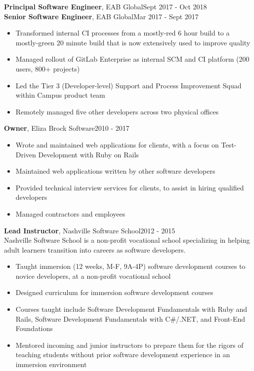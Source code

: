 \documentclass[line, margin, 10pt]{res}
\begin{document}
\begin{resume}
{\bf Principal Software Engineer}, EAB Global\hfill Sept 2017 - Oct 2018\\
{\bf Senior Software Engineer}, EAB Global\hfill Mar 2017 - Sept 2017
\begin{itemize} \itemsep -2pt  %
  \item Transformed internal CI processes from a mostly-red 6 hour build to a mostly-green 20 minute build that is now extensively used to improve quality
  \item Managed rollout of GitLab Enterprise as internal SCM and CI platform (200 users, 800+ projects)
  \item Led the Tier 3 (Developer-level) Support and Process Improvement Squad within Campus product team
  \item Remotely managed five other developers across two physical offices
\end{itemize}

{\bf Owner}, Eliza Brock Software\hfill 2010 - 2017
\begin{itemize} \itemsep -2pt  %
  \item Wrote and maintained web applications for clients, with a focus on Test-Driven \mbox{Development} with Ruby on Rails
  \item Maintained web applications written by other software developers
  \item Provided technical interview services for clients, to assist in hiring qualified developers
  \item Managed contractors and employees
\end{itemize}

{\bf Lead Instructor}, Nashville Software School\hfill 2012 - 2015\\
Nashville Software School is a non-profit vocational school specializing in helping adult learners transition into careers as software developers.
\begin{itemize} \itemsep -2pt  %
  \item Taught immersion (12 weeks, M-F, 9A-4P) software development courses to novice developers, at a non-profit vocational school
  \item Designed curriculum for immersion software development courses
  \item Courses taught include Software Development Fundamentals with Ruby and Rails, Software Development Fundamentals with C\#/.NET, and Front-End Foundations
  \item Mentored incoming and junior instructors to prepare them for the rigors of teaching students without prior software development experience in an immersion environment\end{itemize}


\end{resume}
\end{document}
